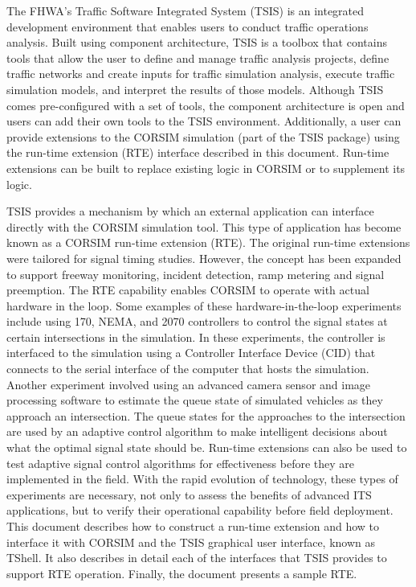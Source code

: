 The FHWA's Traffic Software Integrated System (TSIS) is an integrated development environment that enables
users to conduct traffic operations analysis. Built using component architecture, TSIS is a toolbox that contains
tools that allow the user to define and manage traffic analysis projects, define traffic networks and create inputs for
traffic simulation analysis, execute traffic simulation models, and interpret the results of those models.
Although TSIS comes pre-configured with a set of tools, the component architecture is open and users can add their
own tools to the TSIS environment. Additionally, a user can provide extensions to the CORSIM simulation (part of
the TSIS package) using the run-time extension (RTE) interface described in this document. Run-time extensions
can be built to replace existing logic in CORSIM or to supplement its logic.

TSIS provides a mechanism by which an external application can interface directly with the CORSIM simulation
tool. This type of application has become known as a CORSIM run-time extension (RTE). The original run-time
extensions were tailored for signal timing studies. However, the concept has been expanded to support freeway
monitoring, incident detection, ramp metering and signal preemption.
The RTE capability enables CORSIM to operate with actual hardware in the loop. Some examples of these
hardware-in-the-loop experiments include using 170, NEMA, and 2070 controllers to control the signal states at
certain intersections in the simulation. In these experiments, the controller is interfaced to the simulation using a
Controller Interface Device (CID) that connects to the serial interface of the computer that hosts the simulation.
Another experiment involved using an advanced camera sensor and image processing software to estimate the queue
state of simulated vehicles as they approach an intersection. The queue states for the approaches to the intersection
are used by an adaptive control algorithm to make intelligent decisions about what the optimal signal state should
be. Run-time extensions can also be used to test adaptive signal control algorithms for effectiveness before they are
implemented in the field. With the rapid evolution of technology, these types of experiments are necessary, not only
to assess the benefits of advanced ITS applications, but to verify their operational capability before field
deployment.
This document describes how to construct a run-time extension and how to interface it with CORSIM and the TSIS
graphical user interface, known as TShell. It also describes in detail each of the interfaces that TSIS provides to
support RTE operation. Finally, the document presents a sample RTE.

